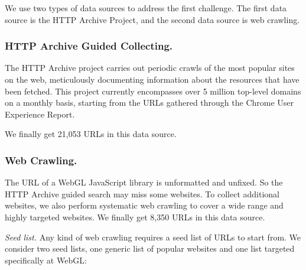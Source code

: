 We use two types of data sources to address the first challenge. The first data source is the HTTP Archive Project, and the second data source is web crawling.

\subsubsection{HTTP Archive Guided Collecting.}

The HTTP Archive project carries out periodic crawls of the most popular sites on the web, meticulously documenting information about the resources that have been fetched. This project currently encompasses over 5 million top-level domains on a monthly basis, starting from the URLs gathered through the Chrome User Experience Report.




We finally get 21,053 URLs in this data source.

\subsubsection{Web Crawling.}

The URL of a WebGL JavaScript library is unformatted and unfixed. So the HTTP Archive guided search may miss some websites. To collect additional websites, we also perform systematic web crawling to cover a wide range and highly targeted websites. We finally get 8,350 URLs in this data source.

\textit{Seed list.} Any kind of web crawling requires a seed list of URLs to start from. We consider two seed lists, one generic list of popular websites and one list targeted specifically at WebGL:

